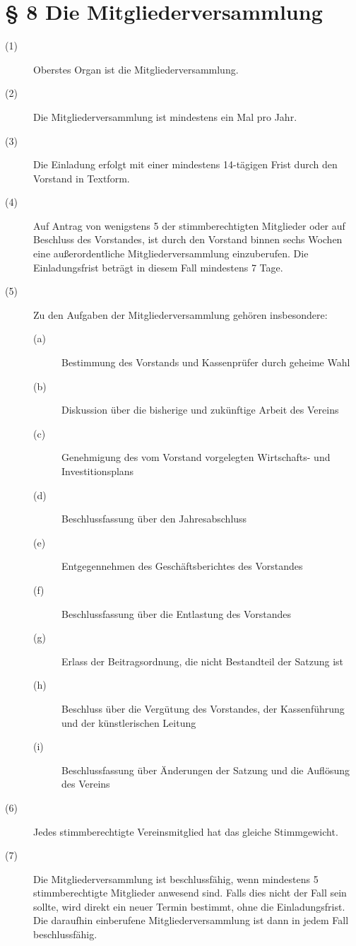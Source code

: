 \documentclass[a4paper,12pt]{scrartcl}
\begin{document}
\section*{\S{} 8 Die Mitgliederversammlung}
\begin{description} 

\item[(1)] Oberstes Organ ist die Mitgliederversammlung.
\item[(2)] Die Mitgliederversammlung ist mindestens ein Mal pro Jahr.
\item[(3)] Die Einladung erfolgt mit einer mindestens 14-tägigen Frist durch den Vorstand in Textform.
\item[(4)] Auf Antrag von wenigstens 5 der stimmberechtigten Mitglieder oder auf Beschluss des Vorstandes, ist durch den Vorstand binnen sechs Wochen eine außerordentliche Mitgliederversammlung einzuberufen. Die Einladungsfrist beträgt in diesem Fall mindestens 7 Tage.
\item[(5)] Zu den Aufgaben der Mitgliederversammlung gehören insbesondere:
\begin{description} 
\item[(a)] Bestimmung des Vorstands und Kassenprüfer durch geheime Wahl
\item[(b)] Diskussion über die bisherige und zukünftige Arbeit des Vereins
\item[(c)] Genehmigung des vom Vorstand vorgelegten Wirtschafts- und Investitionsplans
\item[(d)] Beschlussfassung über den Jahresabschluss
\item[(e)] Entgegennehmen des Geschäftsberichtes des Vorstandes
\item[(f)] Beschlussfassung über die Entlastung des Vorstandes
\item[(g)] Erlass der Beitragsordnung, die nicht Bestandteil der Satzung ist
\item[(h)] Beschluss über die Vergütung des Vorstandes, der Kassenführung und der künstlerischen Leitung
\item[(i)] Beschlussfassung über Änderungen der Satzung und die Auflösung des Vereins 
\end{description}
\item[(6)] Jedes stimmberechtigte Vereinsmitglied hat das gleiche Stimmgewicht.
\item[(7)] Die Mitgliederversammlung ist beschlussfähig, wenn mindestens 5 stimmberechtigte Mitglieder anwesend sind. Falls dies nicht der Fall sein sollte, wird direkt ein neuer Termin bestimmt, ohne die Einladungsfrist. Die daraufhin einberufene Mitgliederversammlung ist dann in jedem Fall beschlussfähig.

\end{description}
\end{document}

